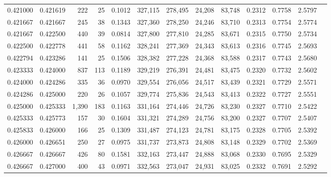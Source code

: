 \begin{tabular}{rrrrrrrrrrrrr}
0.421000 & 0.421619 &   222 &  25 &                                     0.1012 & 327,115 & 278,495 &  24,208 &  83,748 & 0.2312 & 0.7758 & 2.5797 \\
0.421667 & 0.421667 &   245 &  38 &                                     0.1343 & 327,360 & 278,250 &  24,246 &  83,710 & 0.2313 & 0.7754 & 2.5774 \\
0.421667 & 0.422500 &   440 &  39 &                                     0.0814 & 327,800 & 277,810 &  24,285 &  83,671 & 0.2315 & 0.7750 & 2.5734 \\
0.422500 & 0.422778 &   441 &  58 &                                     0.1162 & 328,241 & 277,369 &  24,343 &  83,613 & 0.2316 & 0.7745 & 2.5693 \\
0.422794 & 0.423286 &   141 &  25 &                                     0.1506 & 328,382 & 277,228 &  24,368 &  83,588 & 0.2317 & 0.7743 & 2.5680 \\
0.423333 & 0.424000 &   837 & 113 &                                     0.1189 & 329,219 & 276,391 &  24,481 &  83,475 & 0.2320 & 0.7732 & 2.5602 \\
0.424000 & 0.424286 &   335 &  36 &                                     0.0970 & 329,554 & 276,056 &  24,517 &  83,439 & 0.2321 & 0.7729 & 2.5571 \\
0.424286 & 0.425000 &   220 &  26 &                                     0.1057 & 329,774 & 275,836 &  24,543 &  83,413 & 0.2322 & 0.7727 & 2.5551 \\
0.425000 & 0.425333 & 1,390 & 183 &                                     0.1163 & 331,164 & 274,446 &  24,726 &  83,230 & 0.2327 & 0.7710 & 2.5422 \\
0.425333 & 0.425773 &   157 &  30 &                                     0.1604 & 331,321 & 274,289 &  24,756 &  83,200 & 0.2327 & 0.7707 & 2.5407 \\
0.425833 & 0.426000 &   166 &  25 &                                     0.1309 & 331,487 & 274,123 &  24,781 &  83,175 & 0.2328 & 0.7705 & 2.5392 \\
0.426000 & 0.426651 &   250 &  27 &                                     0.0975 & 331,737 & 273,873 &  24,808 &  83,148 & 0.2329 & 0.7702 & 2.5369 \\
0.426667 & 0.426667 &   426 &  80 &                                     0.1581 & 332,163 & 273,447 &  24,888 &  83,068 & 0.2330 & 0.7695 & 2.5329 \\
0.426667 & 0.427000 &   400 &  43 &                                     0.0971 & 332,563 & 273,047 &  24,931 &  83,025 & 0.2332 & 0.7691 & 2.5292 \\

\end{tabular}
